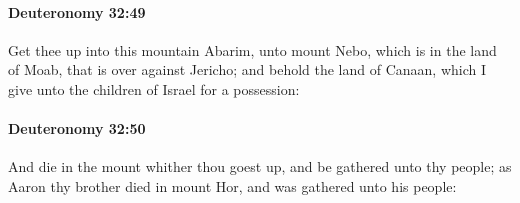 		\paragraph{Deuteronomy 32:49} %
			\label{DEUTERONOMY-32-49}

			Get thee up into this mountain Abarim, unto mount Nebo, which is in the land of Moab, that is over against Jericho; and behold the land of Canaan, which I give unto the children of Israel for a possession:


		\paragraph{Deuteronomy 32:50} %
			\label{DEUTERONOMY-32-50}

			And die in the mount whither thou goest up, and be gathered unto thy people; as Aaron thy brother died in mount Hor, and was gathered unto his people:

